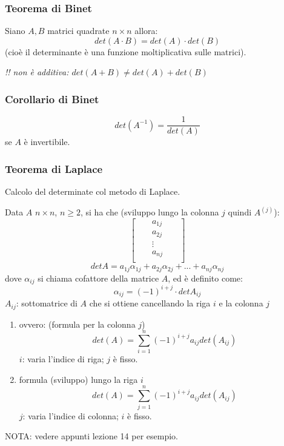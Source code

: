   \subsubsection{Teorema di Binet}
  Siano $A,B$ matrici quadrate $n\times n$ allora:
  \[det(A\cdot B)=det(A)\cdot det(B)\]
  (cioè il determinante è una funzione moltiplicativa sulle matrici).

  \textit{!! non è additiva: $det(A+B)\neq det(A)+det(B)$}

  \subsubsection{Corollario di Binet}

  \[det(A^{-1})=\frac{1}{det(A)}\]
  se $A$ è invertibile.

  \subsubsection{Teorema di Laplace}
  Calcolo del determinate col metodo di Laplace.

  Data $A$ $n\times n$, $n\geq 2$, si ha che (sviluppo lungo la colonna $j$ quindi $A^{(j)}$):
\[
  \begin{bmatrix}
    &&a_{1j}&&\\
    &&a_{2j}&&\\
    &&\vdots&&\\
    &&a_{nj}&&\\
  \end{bmatrix}
\]
\[detA= a_{1j}\alpha_{1j}+a_{2j}\alpha_{2j}+...+a_{nj}\alpha_{nj}\]
dove $\alpha_{ij}$ si chiama cofattore della matrice $A$, ed è definito come:
\[\alpha_{ij}=(-1)^{i+j}\cdot detA_{ij}\]
$A_{ij}$: sottomatrice di $A$ che si ottiene cancellando la riga $i$ e la colonna $j$
\begin{enumerate}
  \item ovvero: (formula per la colonna $j$)
  \[det(A)=\sum_{i=1}^n(-1)^{i+j}a_{ij}det(A_{ij})\]
  $i$: varia l'indice di riga; $j$ è fisso.
\item formula (sviluppo) lungo la riga $i$
  \[det(A)=\sum_{j=1}^n(-1)^{i+j}a_{ij}det(A_{ij})\]
  $j$: varia l'indice di colonna; $i$ è fisso.

\end{enumerate}
NOTA: vedere appunti lezione 14 per esempio.

